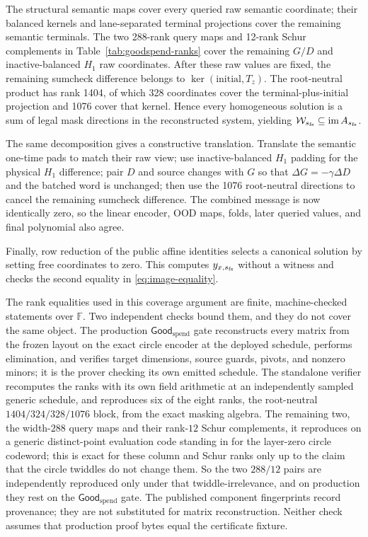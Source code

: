 The structural semantic maps cover every queried raw semantic coordinate;
their balanced kernels and lane-separated terminal projections cover the
remaining semantic terminals.  The two 288-rank query maps and 12-rank Schur
complements in Table~\ref{tab:goodspend-ranks} cover the remaining \(G/D\) and
inactive-balanced \(H_1\) raw coordinates.  After these raw values are fixed,
the remaining sumcheck difference belongs to
\(\ker(\mathrm{initial},T_z)\).  The root-neutral product has rank 1404, of
which 328 coordinates cover the terminal-plus-initial projection and 1076
cover that kernel.  Hence every homogeneous solution is a sum of legal mask
directions in the reconstructed system, yielding
\(\mathcal W_{s_{\rm fs}}\subseteq\operatorname{im}A_{s_{\rm fs}}\).

The same decomposition gives a constructive translation.  Translate the
semantic one-time pads to match their raw view; use inactive-balanced
\(H_1\) padding for the physical \(H_1\) difference; pair \(D\) and source
changes with \(G\) so that
\(\Delta G=-\gamma\Delta D\) and the batched word is unchanged; then use the
1076 root-neutral directions to cancel the remaining sumcheck difference.
The combined message is now identically zero, so the linear encoder, OOD
maps, folds, later queried values, and final polynomial also agree.

Finally, row reduction of the public affine identities selects a canonical
solution by setting free coordinates to zero.  This computes
\(y_{x,s_{\rm fs}}\) without a witness and checks the second equality in
\eqref{eq:image-equality}.

The rank equalities used in this coverage argument are finite,
machine-checked statements over \(\mathbb F\).  Two independent checks bound
them, and they do not cover the same object.  The production
\(\mathsf{Good}_{\mathrm{spend}}\) gate reconstructs every matrix from the
frozen layout on the exact circle encoder at the deployed schedule, performs
elimination, and verifies target dimensions, source guards, pivots, and nonzero
minors; it is the prover checking its own emitted schedule.  The standalone
verifier  recomputes the ranks with its own
field arithmetic at an independently sampled generic schedule, and reproduces
six of the eight ranks, the root-neutral \(1404/324/328/1076\) block, from the
exact masking algebra.  The remaining two, the width-\(288\) query maps and
their rank-\(12\) Schur complements, it reproduces on a generic distinct-point
evaluation code standing in for the layer-zero circle codeword; this is exact
for these column and Schur ranks only up to the claim that the circle twiddles
do not change them.  So the two \(288/12\) pairs are independently reproduced
only under that twiddle-irrelevance, and on production they rest on the
\(\mathsf{Good}_{\mathrm{spend}}\) gate.  The published component fingerprints
record provenance; they are not substituted for matrix reconstruction.  Neither
check assumes that production proof bytes equal the certificate fixture.

